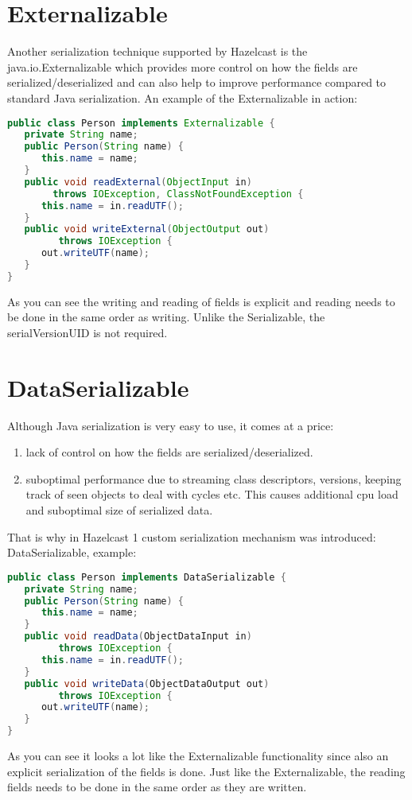 \section{Externalizable}
Another serialization technique supported by Hazelcast is the java.io.Externalizable which provides more control on how the fields are serialized/deserialized and can also help to improve performance compared to standard Java serialization. An example of the Externalizable in action:
\begin{lstlisting}[language=java]
public class Person implements Externalizable {
   private String name;
   public Person(String name) {
      this.name = name;
   }
   public void readExternal(ObjectInput in) 
        throws IOException, ClassNotFoundException {
      this.name = in.readUTF();
   }
   public void writeExternal(ObjectOutput out) 
         throws IOException {
      out.writeUTF(name);
   }
}
\end{lstlisting}
As you can see the writing and reading of fields is explicit and reading needs to be done in the same order as writing. Unlike the Serializable, the serialVersionUID is not required.

\section{DataSerializable}
Although Java serialization is very easy to use, it comes at a price:
\begin{enumerate}
\item lack of control on how the fields are serialized/deserialized.
\item suboptimal performance due to streaming class descriptors, versions, keeping track of seen objects to deal with cycles etc. This causes additional cpu load and suboptimal size of serialized data.
\end{enumerate}
That is why in Hazelcast 1 custom serialization mechanism was introduced: DataSerializable, example:
\begin{lstlisting}[language=java]
public class Person implements DataSerializable {
   private String name;
   public Person(String name) {
      this.name = name;
   }
   public void readData(ObjectDataInput in) 
         throws IOException {
      this.name = in.readUTF();
   }
   public void writeData(ObjectDataOutput out) 
         throws IOException {
      out.writeUTF(name);
   }
}
\end{lstlisting}
As you can see it looks a lot like the Externalizable functionality since also an explicit serialization of the fields is done. Just like the Externalizable, the reading fields needs to be done in the same order as they are written.

